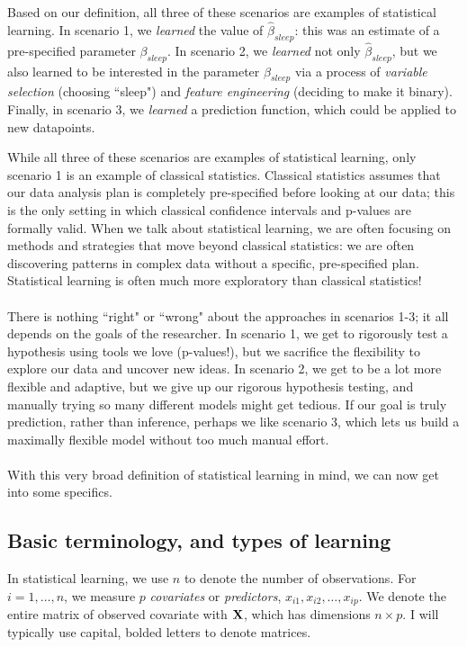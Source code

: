 Based on our definition, all three of these scenarios are examples of statistical learning. In scenario 1, we \emph{learned} the value of $\hat{\beta}_{sleep}$: this was an estimate of a pre-specified parameter $\beta_{sleep}$. In scenario 2, we \emph{learned} not only $\hat{\beta}_{sleep}$, but we also learned to be interested in the parameter $\beta_{sleep}$ via a process of \emph{variable selection} (choosing ``sleep") and \emph{feature engineering} (deciding to make it binary). Finally, in scenario 3, we \emph{learned} a prediction function, which could be applied to new datapoints. 

While all three of these scenarios are examples of statistical learning, only scenario 1 is an example of classical statistics. Classical statistics  assumes that our data analysis plan is completely pre-specified before looking at our data; this is the only setting in which classical confidence intervals and p-values are formally valid. When we talk about statistical learning, we are often focusing on methods and strategies that move beyond classical statistics: we are often discovering patterns in complex data without a specific, pre-specified plan. Statistical learning is often much more exploratory than classical statistics!\\
\\
There is nothing ``right" or ``wrong" about the approaches in scenarios 1-3; it all depends on the goals of the researcher. In scenario 1, we get to rigorously test a hypothesis using tools we love (p-values!), but we sacrifice the flexibility to explore our data and uncover new ideas. In scenario 2, we get to be a lot more flexible and adaptive, but we give up our rigorous hypothesis testing, and manually trying so many different models might get tedious. If our goal is truly prediction, rather than inference, perhaps we like scenario 3, which lets us build a maximally flexible model without too much manual effort. \\
\\
With this very broad definition of statistical learning in mind, we can now get into some specifics.

\subsection{Basic terminology, and types of learning}

In statistical learning, we use $n$ to denote the number of observations. For $i=1,\ldots,n$, we measure $p$ \emph{covariates} or \emph{predictors}, $x_{i1}, x_{i2}, \ldots, x_{ip}$. We denote the entire matrix of observed covariate with $\bold{X}$, which has dimensions $n \times p$. I will typically use capital, bolded letters to denote matrices.

